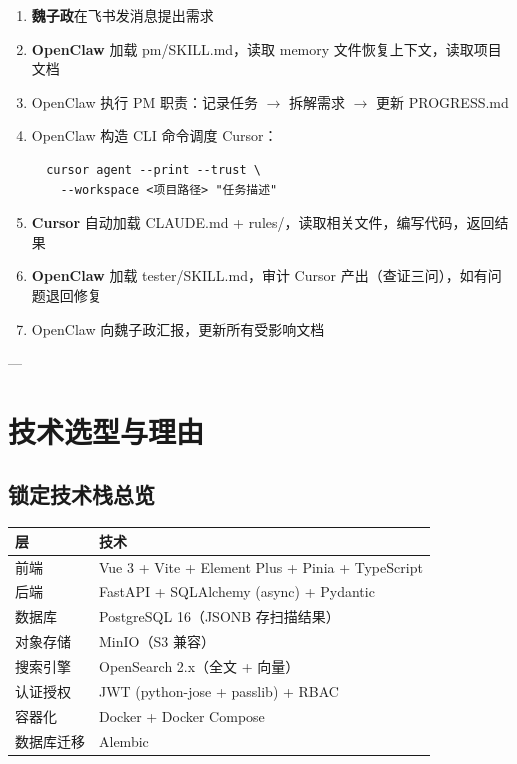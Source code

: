 \documentclass[11pt,a4paper]{article}
\begin{document}
\begin{enumerate}[nosep]
  \item \textbf{魏子政}在飞书发消息提出需求
  \item \textbf{OpenClaw} 加载 pm/SKILL.md，读取 memory 文件恢复上下文，读取项目文档
  \item OpenClaw 执行 PM 职责：记录任务 $\to$ 拆解需求 $\to$ 更新 PROGRESS.md
  \item OpenClaw 构造 CLI 命令调度 Cursor：
  \begin{verbatim}
  cursor agent --print --trust \
    --workspace <项目路径> "任务描述"
  \end{verbatim}
  \item \textbf{Cursor} 自动加载 CLAUDE.md + rules/，读取相关文件，编写代码，返回结果
  \item \textbf{OpenClaw} 加载 tester/SKILL.md，审计 Cursor 产出（查证三问），如有问题退回修复
  \item OpenClaw 向魏子政汇报，更新所有受影响文档
\end{enumerate}

---

\section{技术选型与理由}

\subsection{锁定技术栈总览}

\begin{table}[h]
\centering
\begin{tabularx}{\linewidth}{lX}
\toprule
\textbf{层} & \textbf{技术} \\
\midrule
前端 & Vue 3 + Vite + Element Plus + Pinia + TypeScript \\
后端 & FastAPI + SQLAlchemy (async) + Pydantic \\
数据库 & PostgreSQL 16（JSONB 存扫描结果） \\
对象存储 & MinIO（S3 兼容） \\
搜索引擎 & OpenSearch 2.x（全文 + 向量） \\
认证授权 & JWT (python-jose + passlib) + RBAC \\
容器化 & Docker + Docker Compose \\
数据库迁移 & Alembic \\
\bottomrule
\end{tabularx}
\end{table}
\end{document}
